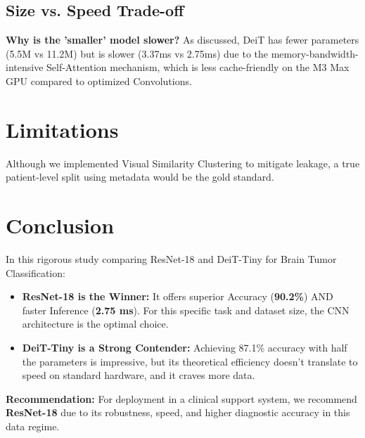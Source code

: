 \documentclass[12pt, a4paper]{article}
\begin{document}
\subsection{Size vs. Speed Trade-off}
\textbf{Why is the 'smaller' model slower?}
As discussed, DeiT has fewer parameters (5.5M vs 11.2M) but is slower (3.37ms vs 2.75ms) due to the memory-bandwidth-intensive Self-Attention mechanism, which is less cache-friendly on the M3 Max GPU compared to optimized Convolutions.

\section{Limitations}
Although we implemented Visual Similarity Clustering to mitigate leakage, a true patient-level split using metadata would be the gold standard.

\section{Conclusion}
In this rigorous study comparing ResNet-18 and DeiT-Tiny for Brain Tumor Classification:

\begin{itemize}
    \item \textbf{ResNet-18 is the Winner:} It offers superior Accuracy (\textbf{90.2\%}) AND faster Inference (\textbf{2.75 ms}). For this specific task and dataset size, the CNN architecture is the optimal choice.
    \item \textbf{DeiT-Tiny is a Strong Contender:} Achieving 87.1\% accuracy with half the parameters is impressive, but its theoretical efficiency doesn't translate to speed on standard hardware, and it craves more data.
\end{itemize}

\textbf{Recommendation:} For deployment in a clinical support system, we recommend \textbf{ResNet-18} due to its robustness, speed, and higher diagnostic accuracy in this data regime.
\end{document}
